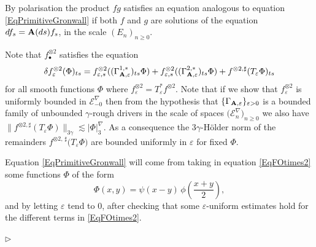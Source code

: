 \documentclass[11pt,a4paper]{amsart}
\newcommand{\mcE}{\mathcal{E}}
\renewcommand{\geq}{\geqslant}
\newcommand{\ssk}{\smallskip}
\numberwithin{equation}{section} %
\newenvironment{Dem}{%
    \begin{list}{\hspace{0.5cm}{\sc Proof --}}{%
        \setlength{\topsep}{0pt}%
        \setlength{\leftmargin}{0pt}%
        \setlength{\rightmargin}{0pt}%
        \setlength{\listparindent}{0pt}%
        \setlength{\itemindent}{0pt}%
        \setlength{\parsep}{0pt}%
        \addtolength{\leftmargin}{20pt}%
        \addtolength{\rightmargin}{0pt}%
    } \item }{\hfill{\space $\rhd$}\end{list}\smallskip}
\begin{document}
\ssk
 
\noindent By polarisation the product $fg$ satisfies an equation analogous to equation \eqref{EqPrimitiveGronwall} if both $f$ and $g$ are solutions of the equation $df_s = {\bf A}(ds)f_s$, in the scale $(E_n)_{n\geq 0}$.

\bigskip

\begin{Dem}
Note that $f_\bullet^{\otimes 2}$ satisfies the equation
\begin{equation}
\label{EqFOtimes2}
\delta f^{\otimes 2}_\varepsilon (\Phi)_{ts} = f^{\otimes 2}_{\varepsilon,s}((\Gamma_{\bf A,\varepsilon}^{1,*})_{ts}\Phi) +f^{\otimes 2}_{\varepsilon,s} ( (\Gamma_{\bf A,\varepsilon}^{2,*})_{ts}\Phi) +  f^{\otimes 2,\sharp}( T_\varepsilon\Phi)_{ts}
\end{equation}
for all smooth functions $\Phi$ where $f^{\otimes 2}_\varepsilon = T^*_\varepsilon f^{\otimes 2}$.
Note that if we show that $f^{\otimes 2}_\varepsilon$ is uniformly bounded in $\mcE^\nabla_{-0}$ then from the hypothesis that  $\{\Gamma_{\bf A,\varepsilon}\}_{\varepsilon>0}$ is a bounded family of unbounded $\gamma$-rough drivers in the scale of spaces $\big(\mcE^\nabla_n\big)_{n\geq 0}$ we also have
 $\big\|f^{\otimes 2,\sharp}(T_\varepsilon \Phi)\big\|_{3\gamma}\lesssim \big| \Phi\big|^\nabla_3$. As a consequence the $3\gamma$-H\"older norm of the remainders $f^{\otimes 2,\,\sharp}\big(T_\varepsilon \Phi\big)$ are bounded uniformly in  $\varepsilon$ for fixed $\Phi$. 

Equation \eqref{EqPrimitiveGronwall} will come from taking in equation \eqref{EqFOtimes2} some functions $\Phi$ of the form
$$
\Phi(x,y) = \psi(x-y)\,\phi\left(\frac{x+y}{2}\right),
$$
and by letting $\varepsilon$ tend to $0$, after checking that some $\varepsilon$-uniform estimates hold for the different terms in \eqref{EqFOtimes2}.


\end{Dem}
\end{document}
